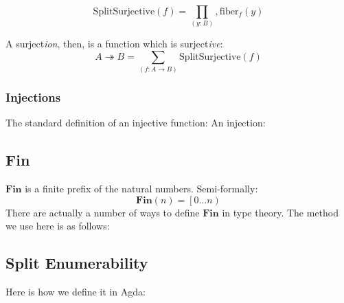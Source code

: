 \begin{refsection}
\begin{subappendices}
\begin{equation}
  \text{SplitSurjective}(f) = \prod_{(y : B)} , \text{fiber}_f(y)
\end{equation}

A surject\emph{ion}, then, is a function which is surject\emph{ive}:
\begin{equation}
  A \twoheadrightarrow B = \sum_{(f : A \rightarrow B)} \text{SplitSurjective}(f)
\end{equation}
\subsubsection{Injections}
The standard definition of an injective function:
An injection:
\subsection{Fin}
\(\textbf{Fin}\) is a finite prefix of the natural numbers.
Semi-formally:
\begin{equation}
  \textbf{Fin}(n) = \left[ 0 \dots n \right)
\end{equation}
There are actually a number of ways to define \(\textbf{Fin}\) in type theory.
The method we use here is as follows:
\subsection{Split Enumerability}
Here is how we define it in Agda:

\end{subappendices}
\end{refsection}
